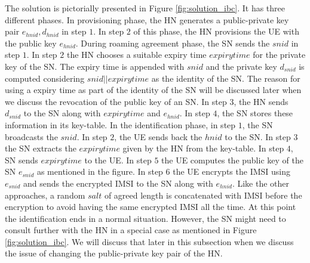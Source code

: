 \documentclass[runningheads,a4paper]{llncs} %
\begin{document}
The solution is pictorially presented in Figure \ref{fig:solution_ibc}. It has three different phases. In provisioning phase, the HN generates a public-private key pair $e_{hnid},d_{hnid}$ in step $1$. In step $2$ of this phase, the HN provisions the UE with the public key $e_{hnid}$. During roaming agreement phase, the SN sends the $snid$ in step $1$. In step $2$ the HN chooses a suitable expiry time $expirytime$ for the private key of the SN. The expiry time is appended with $snid$ and the private key $d_{snid}$ is computed considering $snid||expirytime$ as the identity of the SN. The reason for using a expiry time as part of the identity of the SN will be discussed later when we discuss the revocation of the public key of an SN. In step $3$, the HN sends $d_{snid}$ to the SN along with $expirytime$ and $e_{hnid}$. In step $4$, the SN stores these information in its key-table. In the identification phase, in step $1$, the SN broadcasts the $snid$. In step $2$, the UE sends back the $hnid$ to the SN. In step $3$ the SN extracts the $expirytime$ given by the HN from the key-table. In step $4$, SN sends $expirytime$ to the UE. In step $5$ the UE computes the public key of the SN $e_{snid}$ as mentioned in the figure. In step $6$ the UE encrypts the IMSI using $e_{snid}$ and sends the encrypted IMSI to the SN along with $e_{hnid}$. Like the other approaches, a random $salt$ of agreed length is concatenated with IMSI before the encryption to avoid having the same encrypted IMSI all the time. At this point the identification ends in a normal situation. However, the SN might need to consult further with the HN in a special case as mentioned in Figure \ref{fig:solution_ibc}. We will discuss that later in this subsection when we discuss the issue of changing the public-private key pair of the HN. 
\end{document}
